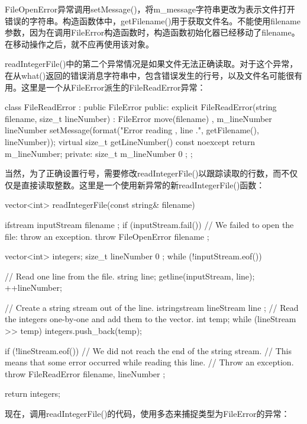 FileOpenError异常调用setMessage()，将m\_message字符串更改为表示文件打开错误的字符串。构造函数体中，getFilename()用于获取文件名。不能使用filename参数，因为在调用FileError构造函数时，构造函数初始化器已经移动了filename。在移动操作之后，就不应再使用该对象。

readIntegerFile()中的第二个异常情况是如果文件无法正确读取。对于这个异常，在从what()返回的错误消息字符串中，包含错误发生的行号，以及文件名可能很有用。这里是一个从FileError派生的FileReadError异常：

\begin{cpp}
class FileReadError : public FileError
{
    public:
        explicit FileReadError(string filename, size_t lineNumber)
        : FileError { move(filename) }, m_lineNumber { lineNumber }
        {
            setMessage(format("Error reading {}, line {}.",
            getFilename(), lineNumber));
        }
        virtual size_t getLineNumber() const noexcept { return m_lineNumber; }
    private:
        size_t m_lineNumber { 0 };
};
\end{cpp}

当然，为了正确设置行号，需要修改readIntegerFile()以跟踪读取的行数，而不仅仅是直接读取整数。这里是一个使用新异常的新readIntegerFile()函数：

\begin{cpp}
vector<int> readIntegerFile(const string& filename)
{
    ifstream inputStream { filename };
    if (inputStream.fail()) {
        // We failed to open the file: throw an exception.
        throw FileOpenError { filename };
    }

    vector<int> integers;
    size_t lineNumber { 0 };
    while (!inputStream.eof()) {
        // Read one line from the file.
        string line;
        getline(inputStream, line);
        ++lineNumber;

        // Create a string stream out of the line.
        istringstream lineStream { line };
        // Read the integers one-by-one and add them to the vector.
        int temp;
        while (lineStream >> temp) {
            integers.push_back(temp);
        }

        if (!lineStream.eof()) {
            // We did not reach the end of the string stream.
            // This means that some error occurred while reading this line.
            // Throw an exception.
            throw FileReadError { filename, lineNumber };
        }
    }
    return integers;
}
\end{cpp}

现在，调用readIntegerFile()的代码，使用多态来捕捉类型为FileError的异常：


